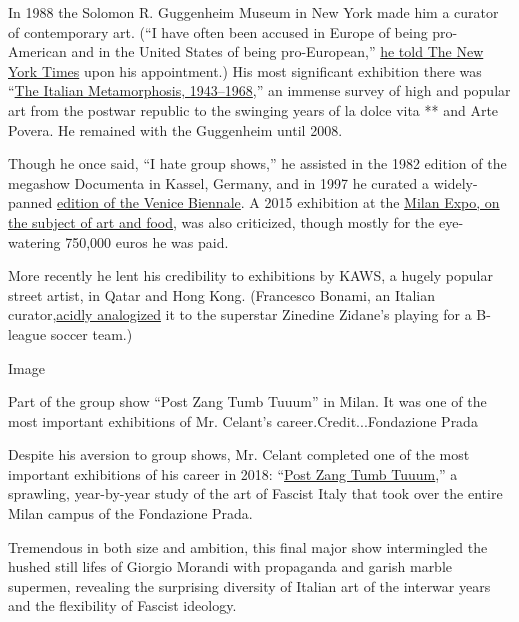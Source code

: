In 1988 the Solomon R. Guggenheim Museum in New York made him a curator
of contemporary art. (``I have often been accused in Europe of being
pro-American and in the United States of being pro-European,''
\href{https://www.nytimes.com/1988/12/01/arts/guggenheim-names-curator.html}{he
told The New York Times} upon his appointment.) His most significant
exhibition there was
``\href{https://www.nytimes.com/1994/10/07/arts/art-review-from-postwar-italy-with-style.html}{The
Italian Metamorphosis, 1943--1968},'' an immense survey of high and
popular art from the postwar republic to the swinging years of la dolce
vita ** and Arte Povera. He remained with the Guggenheim until 2008.

Though he once said, ``I hate group shows,'' he assisted in the 1982
edition of the megashow Documenta in Kassel, Germany, and in 1997 he
curated a widely-panned
\href{https://www.nytimes.com/1997/06/16/arts/another-venice-biennale-shuffles-to-life.html}{edition
of the Venice Biennale}. A 2015 exhibition at the
\href{https://www.nytimes.com/2015/05/04/arts/international/at-milan-worlds-fair-164-years-of-food-and-art.html}{Milan
Expo, on the subject of art and food}, was also criticized, though
mostly for the eye-watering 750,000 euros he was paid.

More recently he lent his credibility to exhibitions by KAWS, a hugely
popular street artist, in Qatar and Hong Kong. (Francesco Bonami, an
Italian
curator,\href{https://www.instagram.com/p/BvbdW6_F3Hl/?hl=en}{acidly
analogized} it to the superstar Zinedine Zidane's playing for a B-league
soccer team.)

Image

Part of the group show ``Post Zang Tumb Tuuum'' in Milan. It was one of
the most important exhibitions of Mr. Celant's
career.Credit...Fondazione Prada

Despite his aversion to group shows, Mr. Celant completed one of the
most important exhibitions of his career in 2018:
``\href{https://www.nytimes.com/2018/03/21/arts/design/italian-art-fondazione-prada-palazzo-strozzi.html}{Post
Zang Tumb Tuuum},'' a sprawling, year-by-year study of the art of
Fascist Italy that took over the entire Milan campus of the Fondazione
Prada.

Tremendous in both size and ambition, this final major show intermingled
the hushed still lifes of Giorgio Morandi with propaganda and garish
marble supermen, revealing the surprising diversity of Italian art of
the interwar years and the flexibility of Fascist ideology.

